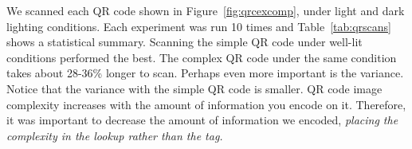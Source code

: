 We scanned each QR code shown in Figure~\ref{fig:qrcexcomp}, under light and dark lighting conditions.  
Each experiment was run 10 times and Table~\ref{tab:qrscans} shows a statistical summary.  Scanning the simple QR code under well-lit 
conditions performed the best.  The complex QR code under  the same condition takes about 28-36\% longer to scan.
Perhaps even more important is the variance.  Notice that the variance with the simple QR code is smaller.
QR code image complexity increases with the amount of information you encode on it.  Therefore, it was important to decrease the
amount of information we encoded, \emph{placing the complexity in the lookup rather than the tag.}


